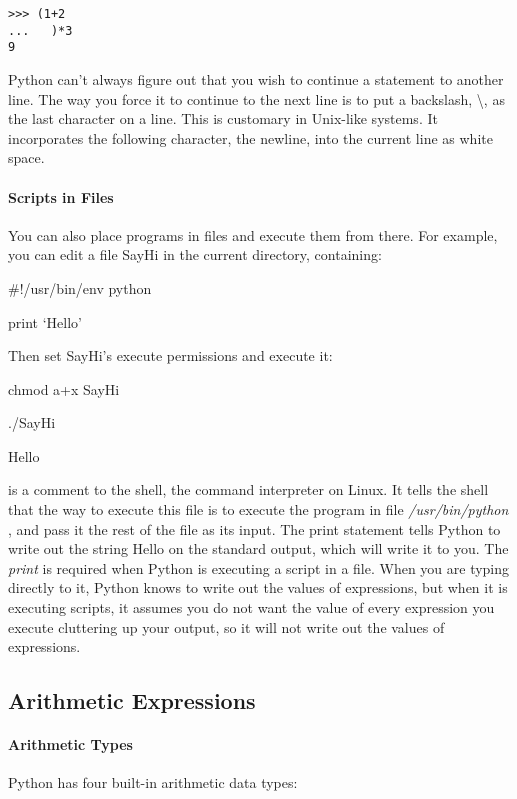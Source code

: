 \begin{verbatim}
>>> (1+2
...   )*3
9
\end{verbatim}

Python can't always figure out
that you wish to continue a statement to another line. The way you force
it to continue to the next line is to put a backslash, \textbackslash{},
as the last character on a line. This is customary in Unix-like systems.
It incorporates the following character, the newline, into the current
line as white space.

\paragraph{Scripts in Files}

You can also place programs in
files and execute them from there. For example, you can edit a file
SayHi in the current directory, containing:

\#!/usr/bin/env python

print `Hello'

Then set SayHi's execute
permissions and execute it:

chmod a+x SayHi

./SayHi

Hello

 is a
comment to the shell, the command interpreter on Linux. It tells the
shell that the way to execute this file is to execute the program in
file \emph{/usr/bin/python} , and pass it the rest of the file as its
input. The print statement tells Python to write out the string Hello on
the standard output, which will write it to you. The \emph{print} is
required when Python is executing a script in a file. When you are
typing directly to it, Python knows to write out the values of
expressions, but when it is executing scripts, it assumes you do not
want the value of every expression you execute cluttering up your
output, so it will not write out the values of expressions.

\subsection{Arithmetic Expressions}

\paragraph{Arithmetic Types}

Python has four built-in arithmetic
data types:

